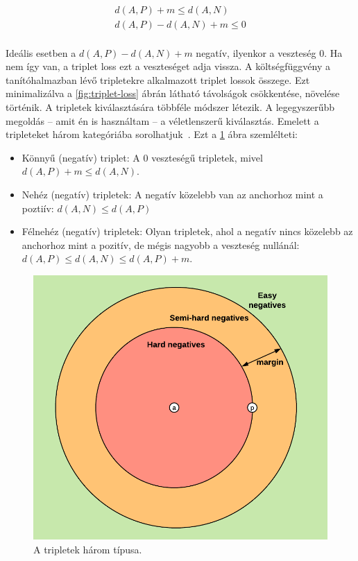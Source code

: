 \begin{equation}\label{eq:5}
\begin{aligned}
d(A, P) + m \le d(A, N) \\
d(A, P) - d(A, N) + m \le 0
\end{aligned}
\end{equation}
\ \\
Ideális esetben a $d(A, P) - d(A, N) + m$ negatív, ilyenkor a veszteség 0. Ha nem így van, a triplet loss ezt a veszteséget adja vissza. A költségfüggvény a tanítóhalmazban lévő tripletekre alkalmazott triplet lossok összege. Ezt minimalizálva a \ref{fig:triplet-loss} ábrán látható távolságok csökkentése, növelése történik.
\newline
\newline
A tripletek kiválasztására többféle módszer létezik. A legegyszerűbb megoldás
-- amit én is használtam -- a véletlenszerű kiválasztás. Emelett a tripleteket három kategóriába sorolhatjuk~\cite{triplet_semi_hard}\cite{triplet_github}. Ezt a \ref{fig:triplet-type} ábra szemlélteti:
\begin{itemize}
	\item Könnyű (negatív) triplet: A 0 veszteségű tripletek, mivel $d(A, P) + m \le d(A, N)$.
	\item Nehéz (negatív) tripletek: A negatív közelebb van az anchorhoz mint a poztiív: $d(A, N) \le d(A, P)$
	\item Félnehéz (negatív) tripletek: Olyan tripletek, ahol a negatív nincs közelebb az anchorhoz mint a pozitív, de mégis nagyobb a veszteség nullánál: $d(A, P) \le d(A, N) \le d(A, P) + m$.
\end{itemize}

\begin{figure}[!ht]
	\centering
	\includegraphics[width=120mm, keepaspectratio]{figures/triplet_type.png}
	\caption{A tripletek három típusa.}
	\label{fig:triplet-type}
\end{figure}

